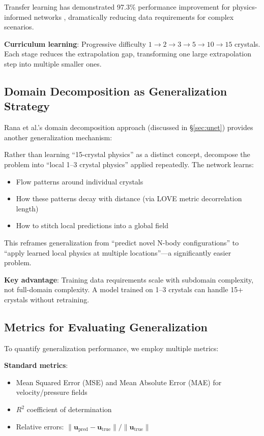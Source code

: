 Transfer learning has demonstrated 97.3\% performance improvement for physics-informed networks \cite{pellegrin2022transfer}, dramatically reducing data requirements for complex scenarios.

\textbf{Curriculum learning}: Progressive difficulty $1 \rightarrow 2 \rightarrow 3 \rightarrow 5 \rightarrow 10 \rightarrow 15$ crystals. Each stage reduces the extrapolation gap, transforming one large extrapolation step into multiple smaller ones.

\subsection{Domain Decomposition as Generalization Strategy}

Rana et al.'s \cite{rana2024scalable_cnn} domain decomposition approach (discussed in \S\ref{sec:unet}) provides another generalization mechanism:

Rather than learning ``15-crystal physics'' as a distinct concept, decompose the problem into ``local 1--3 crystal physics'' applied repeatedly. The network learns:
\begin{itemize}
    \item Flow patterns around individual crystals
    \item How these patterns decay with distance (via LOVE metric decorrelation length)
    \item How to stitch local predictions into a global field
\end{itemize}

This reframes generalization from ``predict novel N-body configurations'' to ``apply learned local physics at multiple locations''---a significantly easier problem.

\textbf{Key advantage}: Training data requirements scale with subdomain complexity, not full-domain complexity. A model trained on 1--3 crystals can handle 15+ crystals without retraining.

\subsection{Metrics for Evaluating Generalization}

To quantify generalization performance, we employ multiple metrics:

\textbf{Standard metrics}:
\begin{itemize}
    \item Mean Squared Error (MSE) and Mean Absolute Error (MAE) for velocity/pressure fields
    \item $R^2$ coefficient of determination
    \item Relative errors: $\|\mathbf{u}_{\text{pred}} - \mathbf{u}_{\text{true}}\| / \|\mathbf{u}_{\text{true}}\|$
\end{itemize}

